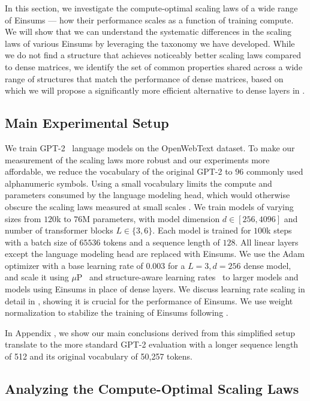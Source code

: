 \documentclass{article}
\newcommand{\mup}{$\mu$P}
\begin{document}
In this section, we investigate the compute-optimal scaling laws of a wide range of Einsums --- how their performance scales as a function of training compute. We will show that we can understand the systematic differences in the scaling laws of various Einsums by leveraging the taxonomy we have developed. While we do not find a structure that achieves noticeably better scaling laws compared to dense matrices, we identify the set of common properties shared across a wide range of structures that match the performance of dense matrices, based on which we will propose a significantly more efficient alternative to dense layers in . 

\subsection{Main Experimental Setup}
 We train GPT-2~\citep{radford2019gpt2} language models on the OpenWebText dataset. To make our measurement of the scaling laws more robust and our experiments more affordable, we reduce the vocabulary of the original GPT-2 to $96$ commonly used alphanumeric symbols. Using a small vocabulary limits the compute and parameters consumed by the language modeling head, which would otherwise obscure the scaling laws measured at small scales \citep{kaplan2020scaling}. We train models of varying sizes from $120$k to $76$M parameters, with model dimension $d \in [256, 4096]$ and number of transformer blocks $L \in \{3, 6\}.$ Each model is trained for $100$k steps with a batch size of $65536$ tokens and a sequence length of $128.$ All linear layers except the language modeling head are replaced with Einsums.  We use the Adam optimizer with a base learning rate of $0.003$ for a $L=3, d=256$ dense model, and scale it using \mup~\citep{yang2023iv} and structure-aware learning rates~\citep{qiu2024compute} to larger models and models using Einsums in place of dense layers. We discuss learning rate scaling in detail in , showing it is crucial for the performance of Einsums. We use weight normalization to stabilize the training of Einsums following \citet{qiu2024compute}.

  In Appendix , we show our main conclusions derived from this simplified setup translate to the more standard GPT-2 evaluation with a longer sequence length of 512 and its original vocabulary of 50,257 tokens.

\subsection{Analyzing the Compute-Optimal Scaling Laws}
\end{document}

